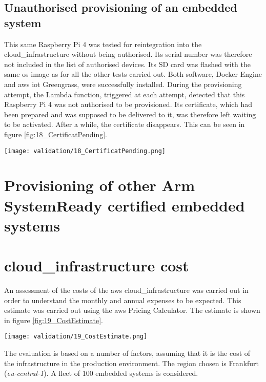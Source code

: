 \subsection{Unauthorised provisioning of an embedded system}
This same Raspberry Pi 4 was tested for reintegration into the \gls{cloud_infrastructure} without being authorised. Its serial number was therefore not included in the list of authorised devices. Its SD card was flashed with the same \acrshort{os} image as for all the other tests carried out. Both software, Docker Engine and \gls{aws} \acrshort{iot} Greengrass, were successfully installed. During the provisioning attempt, the Lambda function, triggered at each attempt, detected that this Raspberry Pi 4 was not authorised to be provisioned. Its certificate, which had been prepared and was supposed to be delivered to it, was therefore left waiting to be activated. After a while, the certificate disappears. This can be seen in figure \ref{fig:18_CertificatPending}.
\begin{center}
    \begingroup
    \texttt{[image: validation/18\_CertificatPending.png]}
    \label{fig:18_CertificatPending}
    \endgroup
\end{center}

\section{Provisioning of other Arm SystemReady certified embedded systems}


\section{\texorpdfstring{\Gls{cloud_infrastructure}}{} cost}

An assessment of the costs of the \gls{aws} \gls{cloud_infrastructure} was carried out in order to understand the monthly and annual expenses to be expected. This estimate was carried out using the \gls{aws} Pricing Calculator. The estimate is shown in figure \ref{fig:19_CostEstimate}.
\begin{center}
    \begingroup
    \texttt{[image: validation/19\_CostEstimate.png]}
    \label{fig:19_CostEstimate}
    \endgroup
\end{center}
The evaluation is based on a number of factors, assuming that it is the cost of the infrastructure in the production environment. The region chosen is Frankfurt (\textit{eu-central-1}). A fleet of 100 embedded systems is considered.

